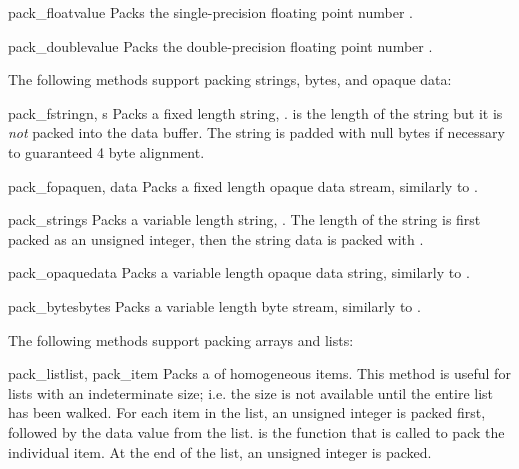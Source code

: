 \begin{methoddesc}[Packer]{pack_float}{value}
Packs the single-precision floating point number .
\end{methoddesc}

\begin{methoddesc}[Packer]{pack_double}{value}
Packs the double-precision floating point number .
\end{methoddesc}

The following methods support packing strings, bytes, and opaque data:

\begin{methoddesc}[Packer]{pack_fstring}{n, s}
Packs a fixed length string, .   is the length of the
string but it is \emph{not} packed into the data buffer.  The string
is padded with null bytes if necessary to guaranteed 4 byte alignment.
\end{methoddesc}

\begin{methoddesc}[Packer]{pack_fopaque}{n, data}
Packs a fixed length opaque data stream, similarly to
.
\end{methoddesc}

\begin{methoddesc}[Packer]{pack_string}{s}
Packs a variable length string, .  The length of the string is
first packed as an unsigned integer, then the string data is packed
with .
\end{methoddesc}

\begin{methoddesc}[Packer]{pack_opaque}{data}
Packs a variable length opaque data string, similarly to
.
\end{methoddesc}

\begin{methoddesc}[Packer]{pack_bytes}{bytes}
Packs a variable length byte stream, similarly to .
\end{methoddesc}

The following methods support packing arrays and lists:

\begin{methoddesc}[Packer]{pack_list}{list, pack_item}
Packs a  of homogeneous items.  This method is useful for
lists with an indeterminate size; i.e. the size is not available until
the entire list has been walked.  For each item in the list, an
unsigned integer  is packed first, followed by the data value
from the list.   is the function that is called to pack
the individual item.  At the end of the list, an unsigned integer
 is packed.
\end{methoddesc}

